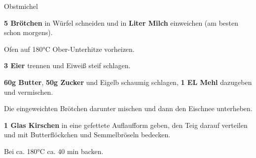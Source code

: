 \begin{recipe}[]{Obstmichel} %


\step
\textbf{5 Brötchen} in Würfel schneiden und in \textbf{ Liter Milch} einweichen (am besten schon morgens).

\step
Ofen auf 180°C Ober-Unterhitze vorheizen.

\step
\textbf{3 Eier} trennen und Eiweiß steif schlagen.

\step
\textbf{60g Butter}, \textbf{50g Zucker} und Eigelb schaumig schlagen, \textbf{1 EL Mehl} dazugeben und vermischen.

\step
Die eingeweichten Brötchen darunter mischen und dann den Eischnee unterheben.

\step
\textbf{1 Glas Kirschen} in eine gefettete Auflaufform geben, den Teig darauf verteilen und mit Butterflöckchen und Semmelbröseln bedecken.

\step
Bei ca. 180°C ca. 40 min backen.





\end{recipe}
